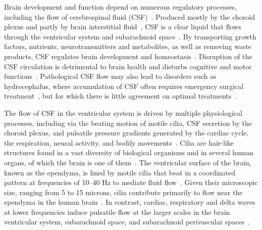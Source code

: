 \documentclass{WileyMSP-template}
\begin{document}
Brain development and function depend on numerous regulatory
processes, including the flow of cerebrospinal fluid
(CSF)~\cite{fame2020emergence}. Produced mostly by the choroid
plexus and partly by brain interstitial fluid~\cite{Brodal2016},
CSF is a clear liquid that flows through the ventricular system and subarachnoid
space~\cite{Damkier2013}. By transporting growth factors, nutrients, neurotransmitters
and metabolites, as well as removing waste products, CSF regulates
brain development and homeostasis~\cite{Ringers2020Role, fame2020emergence, del2010ependymal}.
Disruption of the CSF circulation is detrimental to brain health and disturbs
cognitive and motor functions~\cite{Johanson2008}.
Pathological CSF flow may also lead to
disorders such as hydrocephalus, where accumulation of
CSF often requires emergency surgical
treatment~\cite{duy2022rethinking, kahle2024paediatric, wallmeier2022role},
but for which there is little agreement on optimal treatments~\cite{flannery2014pediatric}. 

The flow of CSF in the ventricular system is driven by multiple
physiological processes, including via the beating motion of motile
cilia, CSF secretion by the choroid plexus, and pulsatile pressure gradients generated by the
cardiac cycle, the respiration, neural activity, and bodily
movements~\cite{Brodal2016, del2010ependymal, Ringers2020Role, Vinje2019RespiratoryMeasurements,
Kurtcuoglu2005ComputationalSystem, Olstad2019CiliaryDevelopment,
macaulay2022cerebrospinal, mestre2018flow}.
Cilia are hair-like structures found in a vast diversity of
biological organisms and in several human organs,
of which the brain is one of them~\cite{DGama2025MotileBrain,
Fulford1986Muco-ciliaryLung,
Pacherres2022CiliaryProduction, Jahn1972LocomotionProtozoa,
Brennen1977FluidFlagella, Ringers2020Role, spassky2013motile,
Pellicciotta2020Cilia, mitchell2007evolution,
Tsukita2012CoordinatedFeet, BLAKE1974MechanicsMotion,
Reiten2017Motile-Cilia-MediatedComputations, Thouvenin2020OriginCanal}. 
The ventricular surface of the brain, known as the ependyma, is lined by
motile cilia that beat in a coordinated pattern at frequencies of
10--40 Hz to mediate fluid flow~\cite{mitchell2007evolution,
Ringers2020Role, spassky2013motile, Ringers2023NovelEpithelia, roth2025structure}. 
Given their microscopic size, ranging from
5 to 15 microns, cilia contribute primarily to flow near the
ependyma in the human brain~\cite{Siyahhan2014FlowVentricles, Olstad2019CiliaryDevelopment,
Ringers2020Role, Faubel2016Cilia-basedVentricles}. In contrast, cardiac,
respiratory and delta waves at lower frequencies induce pulsatile flow
at the larger scales in the brain ventricular system, subarachnoid space, and
subarachnoid perivascular
spaces~\cite{Vinje2019RespiratoryMeasurements, eide2024functional,
Causemann2025, fultz2019coupled, mestre2018flow, daversin2020mechanisms}.
\end{document}
